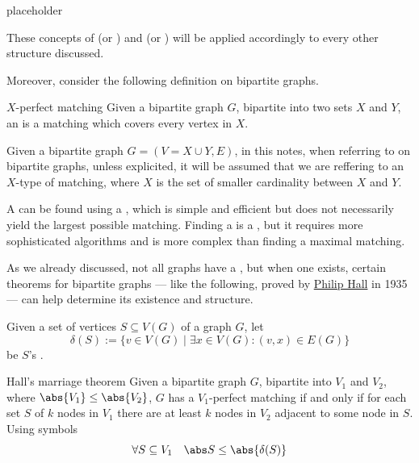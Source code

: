\documentclass[a4paper, 12pt]{report}
\begin{document}
    \begin{example}
        placeholder 
    \end{example}

    These concepts of  (or ) and  (or ) will be applied accordingly to every other structure discussed.

    Moreover, consider the following definition on bipartite graphs.

    \begin{frameddefn}{$X$-perfect matching}
        Given a bipartite graph $G$, bipartite into two sets $X$ and $Y$, an  is a matching which covers every vertex in $X$.
    \end{frameddefn}

    Given a bipartite graph $G=(V = X \cup Y, E)$, in this notes, when referring to  on bipartite graphs, unless explicited, it will be assumed that we are reffering to an $X$-type of matching, where $X$ is the set of smaller cardinality between $X$ and $Y$.

    A  can be found using a , which is simple and efficient but does not necessarily yield the largest possible matching. Finding a  is a , but it requires more sophisticated algorithms and is more complex than finding a maximal matching.

    As we already discussed, not all graphs have a , but when one exists, certain theorems for bipartite graphs --- like the following, proved by \href{https://en.wikipedia.org/wiki/Philip_Hall}{Philip Hall} in 1935 --- can help determine its existence and structure.

    Given a set of vertices $S \subseteq V(G)$ of a graph $G$, let $$\delta(S) := \{v \in V(G) \mid \exists x \in V(G) : (v, x) \in E(G)\}$$ be $S$'s .

    \begin{framedthm}{Hall's marriage theorem}
        Given a bipartite graph $G$, bipartite into $V_1$ and $V_2$, where $\abs{V_1} \le \abs{V_2}$, $G$ has a $V_1$-perfect matching if and only if for each set $S$ of $k$ nodes in $V_1$ there are at least $k$ nodes in $V_2$ adjacent to some node in $S$. Using symbols $$\forall S \subseteq V_1 \quad \abs S \le \abs{\delta(S)}$$
    \end{framedthm}
\end{document}
